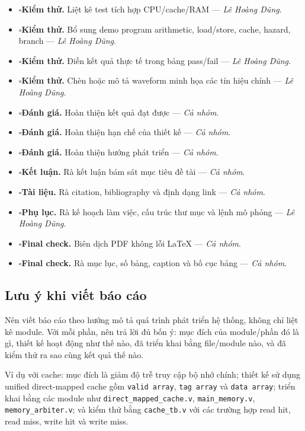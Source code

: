 \documentclass[11pt,a4paper]{article}
\theoremstyle{definition}
\theoremstyle{remark}
\newcommand{\checkbox}{\ensuremath{\square}}
\begin{document}
\begin{itemize}
		\item \checkbox \textbf{Kiểm thử.} Liệt kê test tích hợp CPU/cache/RAM --- \textit{Lê Hoàng Dũng}.
		\item \checkbox \textbf{Kiểm thử.} Bổ sung demo program arithmetic, load/store, cache, hazard, branch --- \textit{Lê Hoàng Dũng}.
		\item \checkbox \textbf{Kiểm thử.} Điền kết quả thực tế trong bảng pass/fail --- \textit{Lê Hoàng Dũng}.
		\item \checkbox \textbf{Kiểm thử.} Chèn hoặc mô tả waveform minh họa các tín hiệu chính --- \textit{Lê Hoàng Dũng}.
		\item \checkbox \textbf{Đánh giá.} Hoàn thiện kết quả đạt được --- \textit{Cả nhóm}.
		\item \checkbox \textbf{Đánh giá.} Hoàn thiện hạn chế của thiết kế --- \textit{Cả nhóm}.
		\item \checkbox \textbf{Đánh giá.} Hoàn thiện hướng phát triển --- \textit{Cả nhóm}.
		\item \checkbox \textbf{Kết luận.} Rà kết luận bám sát mục tiêu đề tài --- \textit{Cả nhóm}.
		\item \checkbox \textbf{Tài liệu.} Rà citation, bibliography và định dạng link --- \textit{Cả nhóm}.
		\item \checkbox \textbf{Phụ lục.} Rà kế hoạch làm việc, cấu trúc thư mục và lệnh mô phỏng --- \textit{Lê Hoàng Dũng}.
		\item \checkbox \textbf{Final check.} Biên dịch PDF không lỗi LaTeX --- \textit{Cả nhóm}.
		\item \checkbox \textbf{Final check.} Rà mục lục, số bảng, caption và bố cục bảng --- \textit{Cả nhóm}.
	\end{itemize}
	
	\subsection{Lưu ý khi viết báo cáo}
	Nên viết báo cáo theo hướng mô tả quá trình phát triển hệ thống, không chỉ liệt kê module. Với mỗi phần, nên trả lời đủ bốn ý: mục đích của module/phần đó là gì, thiết kế hoạt động như thế nào, đã triển khai bằng file/module nào, và đã kiểm thử ra sao cùng kết quả thế nào.
	
	Ví dụ với cache: mục đích là giảm độ trễ truy cập bộ nhớ chính; thiết kế sử dụng unified direct-mapped cache gồm \texttt{valid array}, \texttt{tag array} và \texttt{data array}; triển khai bằng các module như \texttt{direct\_mapped\_cache.v}, \texttt{main\_memory.v}, \texttt{memory\_arbiter.v}; và kiểm thử bằng \texttt{cache\_tb.v} với các trường hợp read hit, read miss, write hit và write miss.
	
\end{document}
